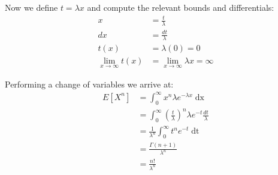 \documentclass{article}
\begin{document}
Now we define $t=\lambda x$ and compute the relevant bounds and differentials:
\begin{align*}
    x&=\frac{t}{\lambda}\\
    dx&=\frac{dt}{\lambda}\\
    t(x)&=\lambda(0)=0\\
    \lim_{x\to\infty} t(x)&=\lim_{x\to\infty} \lambda x=\infty
\end{align*}

Performing a change of variables we arrive at:
\begin{align*}
    E[X^n]&=\int_0^\infty x^n\lambda e^{-\lambda x}\mathop{dx}\\
    &=\int_0^\infty \left(\frac{t}{\lambda}\right)^n \lambda e^{-t}\frac{dt}{\lambda}\tag{change of variables}\\
    &=\frac{1}{\lambda^n}\int_0^\infty t^n e^{-t}\mathop{dt}\\
    &=\frac{\Gamma(n+1)}{\lambda^n}\tag{def. of gamma function}\\
    &=\frac{n!}{\lambda^n}\tag{for $n\in\mathbb N$}\\
\end{align*}
\end{document}
